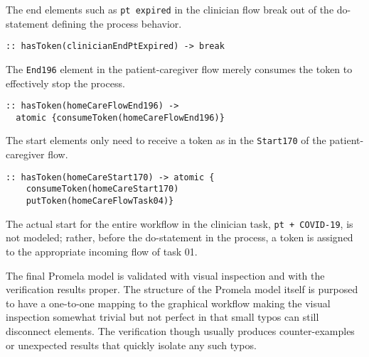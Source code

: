 The end elements such as \texttt{pt expired} in the clinician flow break out of the do-statement defining the process behavior.
%
{\small
\begin{lstlisting}[style=myPromela]
:: hasToken(clinicianEndPtExpired) -> break
\end{lstlisting}
}
%
\noindent The \texttt{End196} element in the patient-caregiver flow merely consumes the token to effectively stop the process.
%
{\small
\begin{lstlisting}[style=myPromela]
:: hasToken(homeCareFlowEnd196) -> 
  atomic {consumeToken(homeCareFlowEnd196)}
\end{lstlisting}
}
% 
\noindent The start elements only need to receive a token as in the \texttt{Start170} of the patient-caregiver flow.
%
{\small
\begin{lstlisting}[style=myPromela]
:: hasToken(homeCareStart170) -> atomic {
    consumeToken(homeCareStart170)
    putToken(homeCareFlowTask04)}
\end{lstlisting}
}
% 
\noindent The actual start for the entire workflow in the clinician task, \texttt{pt + COVID-19}, is not modeled;
rather, before the do-statement in the process, a token is assigned to the appropriate incoming flow of task 01.

The final Promela model is validated with visual inspection and with the verification results proper.
The structure of the Promela model itself is purposed to have a one-to-one mapping to the graphical workflow making the visual inspection somewhat trivial but not perfect in that small typos can still disconnect elements.
The verification though usually produces counter-examples or unexpected results that quickly isolate any such typos.
